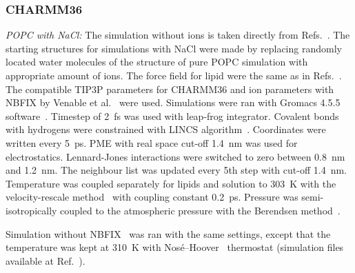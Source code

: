 \documentclass[twoside,twocolumn,9pt]{article}
\begin{document}
\subsubsection{CHARMM36}
{\it POPC with NaCl:}
The simulation without ions is taken directly from Refs.~. 
The starting structures for simulations with NaCl were made by replacing randomly located 
water molecules of the structure of pure POPC simulation with appropriate amount of ions.
The force field for lipid were the same as in Refs.~.
The compatible TIP3P parameters for CHARMM36 and ion parameters with NBFIX by Venable et al.~\cite{venable13} were used.
Simulations were ran with Gromacs 4.5.5 software~\cite{pronk13}.
Timestep of 2~fs was used with leap-frog integrator. Covalent bonds with hydrogens were constrained with LINCS algorithm~\cite{hess97,hess07}. 
Coordinates were written every 5~ps. PME with real space cut-off 1.4~nm was used 
for electrostatics. Lennard-Jones interactions were switched to zero between 0.8~nm and 1.2~nm.
The neighbour list was updated every 5th step with cut-off 1.4~nm. Temperature was coupled separately
for lipids and solution to 303~K with the velocity-rescale method~\cite{bussi07} with coupling constant 0.2~ps.
Pressure was semi-isotropically coupled to the atmospheric pressure with the Berendsen method~\cite{berendsen84}.

Simulation without NBFIX~\cite{venable13} was ran with the same settings, except that 
the temperature was kept at 310~K with Nos{\'e}--Hoover~\cite{nose84,hoover85} thermostat 
(simulation files available at Ref.~). 
\end{document}
